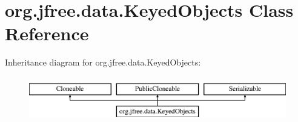 \hypertarget{classorg_1_1jfree_1_1data_1_1_keyed_objects}{}\section{org.\+jfree.\+data.\+Keyed\+Objects Class Reference}
\label{classorg_1_1jfree_1_1data_1_1_keyed_objects}
Inheritance diagram for org.\+jfree.\+data.\+Keyed\+Objects\+:\begin{figure}[H]
\begin{center}
\leavevmode
\includegraphics[height=2.000000cm]{classorg_1_1jfree_1_1data_1_1_keyed_objects}
\end{center}
\end{figure}
